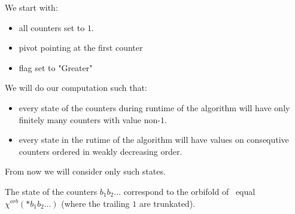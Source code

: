 We start with:
\begin{itemize}
\item all counters set to $1$. 
\item pivot pointing at the first counter
\item flag set to "Greater"
\end{itemize}
We will do our computation such that:
\begin{itemize}
\item every state of the counters during runtime of the algorithm will have only finitely many 
counters with value non-$1$. 
\item every state in the rutime of the algorithm 
will have values on consequtive counters ordered in weakly decreasing order.
\end{itemize}
From now we will 
consider only such states. 

The state of the counters $b_1b_2\dots$ correspond to the orbifold of 
\Eoc\ equal $\chi^{orb}(*b_1b_2\dots)$ (where the trailing $1$ are trunkated). 

